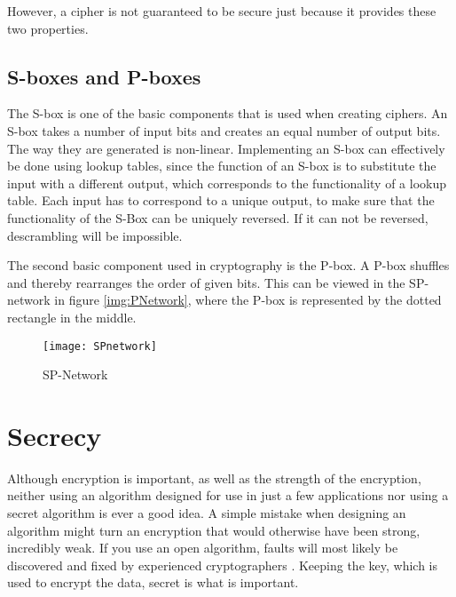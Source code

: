 However, a cipher is not guaranteed to be secure just because it 
provides these two properties.

\subsection{S-boxes and P-boxes}
The S-box is one of the basic components that is used when creating 
ciphers. An S-box takes a number of input bits and creates an equal 
number of output bits. The way they are generated is non-linear. 
Implementing an S-box can effectively be done using lookup tables, since
the function of an S-box is to substitute the input with a different 
output, which corresponds to the functionality of a lookup table.
Each input has to correspond to a unique output, to make sure that the 
functionality of the S-Box can be uniquely reversed. If it can not be 
reversed, descrambling will be impossible. 
\citep[pp. 74--75]{Stinson:2006}

The second basic component used in cryptography is the P-box. A P-box 
shuffles and thereby rearranges the order of given bits. This can be 
viewed in the SP-network in figure \ref{img:PNetwork}, where the P-box 
is represented by the dotted rectangle in the middle.

\begin{figure}[h!]
  \begin{center}
    \texttt{[image: SPnetwork]}
    \caption{SP-Network}
    \label{img:SPNetwork}
  \end{center}
\end{figure}


\section{Secrecy}
Although encryption is important, as well as the strength of the 
encryption, neither using an algorithm designed for use in just a few 
applications nor using a secret algorithm is ever a good idea. A simple 
mistake when designing an algorithm might turn an encryption that would 
otherwise have been strong, incredibly weak. If you use an open 
algorithm, faults will most likely be discovered and fixed by 
experienced cryptographers \citep[pp. 23]{Schneier:2003}. Keeping the 
key, which is used to encrypt the data, secret is what is important.
